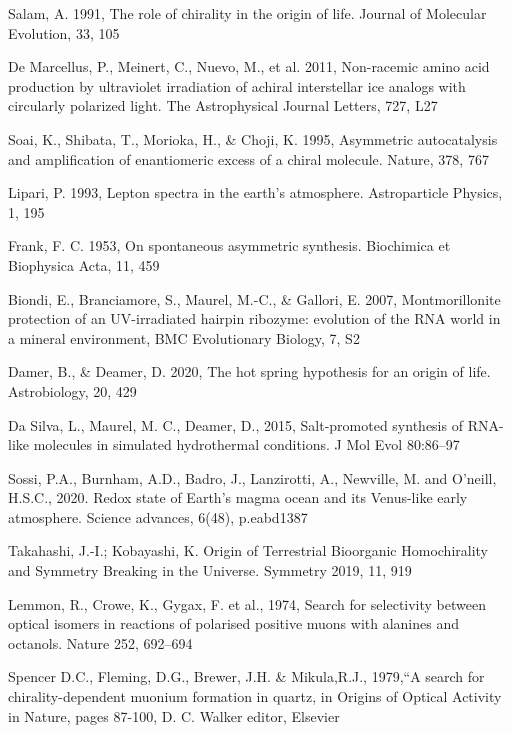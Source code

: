 \documentclass[a4paper,11pt]{article}
\begin{document}
\begin{thebibliography}{99}
  Salam, A. 1991, The role of chirality in the origin of life. Journal of Molecular Evolution, 33, 105
  
  
  De Marcellus, P., Meinert, C., Nuevo, M., et al. 2011, Non-racemic amino acid production by ultraviolet irradiation of achiral interstellar ice analogs with circularly polarized light. The Astrophysical Journal Letters, 727, L27
  
 Soai, K., Shibata, T., Morioka, H., \& Choji, K. 1995, Asymmetric autocatalysis and amplification of enantiomeric excess of a chiral molecule. 
Nature, 378, 767
 
  Lipari, P. 1993, Lepton spectra in the earth's atmosphere. Astroparticle Physics, 1, 195
 
 Frank, F. C. 1953, On spontaneous asymmetric synthesis. Biochimica et Biophysica Acta, 11, 459
 
  Biondi, E., Branciamore, S., Maurel, M.-C., \& Gallori, E. 2007, Montmorillonite protection of an UV-irradiated hairpin ribozyme: evolution of the RNA world in a mineral environment, BMC Evolutionary Biology, 7, S2
 
 Damer, B., \& Deamer, D. 2020, The hot spring hypothesis for an origin of life. Astrobiology, 20, 429

  Da Silva, L.,  Maurel, M. C.,  Deamer, D., 2015, Salt-promoted synthesis of RNA-like molecules in simulated hydrothermal conditions. J Mol Evol 80:86–97
 
 Sossi, P.A., Burnham, A.D., Badro, J., Lanzirotti, A., Newville, M. and O’neill, H.S.C., 2020. Redox state of Earth’s magma ocean and its Venus-like early atmosphere. Science advances, 6(48), p.eabd1387

Takahashi, J.-I.; Kobayashi, K. Origin of Terrestrial Bioorganic Homochirality and Symmetry Breaking in the Universe. Symmetry 2019, 11, 919 

Lemmon, R., Crowe, K., Gygax, F. et al., 1974, Search for selectivity between optical isomers in reactions of polarised positive muons with alanines and octanols. Nature 252, 692–694

Spencer D.C., Fleming, D.G., Brewer, J.H.  \&  Mikula,R.J., 1979,“A search for chirality-dependent muonium formation in quartz, in Origins of Optical Activity in Nature, pages 87-100, D. C. Walker editor, Elsevier 


\end{thebibliography}

 
\end{document}
